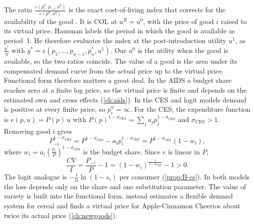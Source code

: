 The ratio $\frac{e(p_i^V, p_{-i}, u^0)}{e(p^0, u^0)}$ is the exact cost-of-living index that corrects for the
availability of the good \citep[eq.~4, p.~212]{Hausman1997}. It is $\mathrm{COL}$ at $u^R = u^0$, with the
price of good $i$ raised to its virtual price. Hausman labels the period in which the good is available as
period~1. He therefore evaluates the index at the post-introduction utility $u^1$, as $\frac{y^*}{y}$ with
$y^* = e(p_1, \dots, p_{n-1}, p_n^*, u^1)$. Our $u^0$ is the utility when the good is available, so the two
ratios coincide. The value of a good is the area under its
compensated demand curve from the actual price up to the virtual price. Functional form therefore matters a
great deal. In the AIDS a budget share reaches zero at a finite log price, so the virtual price is finite
and depends on the estimated own and cross effects (\cref{ch:aids}). In the CES and logit models demand is
positive at every finite price, so $p_i^V = \infty$. For the CES, the expenditure function is
$e(p, u) = P(p)\,u$ with $P(p)^{1 - \sigma_{\mathrm{CES}}} = \sum_ja_jp_j^{1 - \sigma_{\mathrm{CES}}}$ and
$\sigma_{\mathrm{CES}} > 1$. Removing good $i$ gives
\begin{equation*}
P_{-i}^{1 - \sigma_{\mathrm{CES}}} = P^{1 - \sigma_{\mathrm{CES}}} - a_ip_i^{1 - \sigma_{\mathrm{CES}}}
= P^{1 - \sigma_{\mathrm{CES}}}(1 - w_i),
\end{equation*}
where $w_i = a_i\left(\frac{p_i}{P}\right)^{1 - \sigma_{\mathrm{CES}}}$ is the budget share. Since $e$ is linear in $P$,
\begin{equation*}
\frac{CV}{I} = \frac{P_{-i}}{P} - 1 = (1 - w_i)^{\frac{1}{1 - \sigma_{\mathrm{CES}}}} - 1 > 0 .
\end{equation*}
The logit analogue is $-\frac{1}{\alpha}\ln(1 - s_i)$ per consumer (\cref{prop:B-cs}). In both models the loss
depends only on the share and one substitution parameter. The value of variety is built into the
functional form. \citet[p.~210]{Hausman1997} instead estimates a flexible demand system for cereal and finds
a virtual price for Apple-Cinnamon Cheerios about twice its actual price (\cref{ch:newgoods}).


